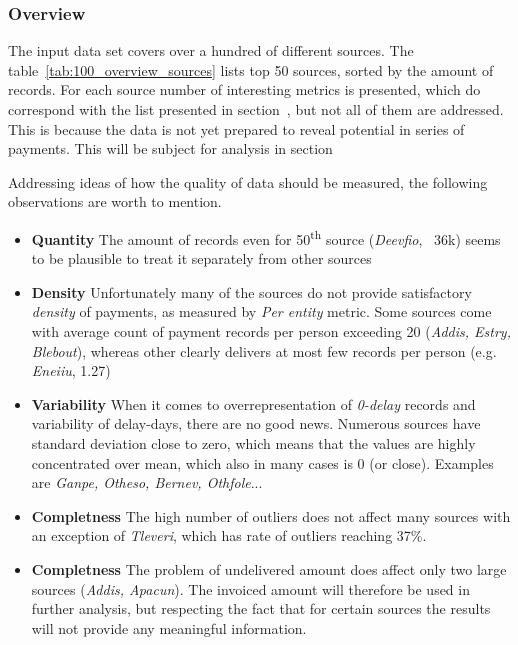 \documentclass{article}
\begin{document}
\subsubsection{Overview}

The input data set covers over a hundred of different sources.
The table\ \ref{tab:100_overview_sources} lists top 50 sources, sorted by the amount of records.
For each source number of interesting metrics is presented, which do correspond with the list presented in section\ , but not all of them are addressed.
This is because the data is not yet prepared to reveal potential in series of payments.
This will be subject for analysis in section\  \par



Addressing ideas of how the quality of data should be measured, the following observations are worth to mention.
\begin{itemize}
    \item \textbf{Quantity} The amount of records even for 50\textsuperscript{th} source (\textit{Deevfio}, ~36k) seems to be plausible to treat it separately from other sources
    \item \textbf{Density} Unfortunately many of the sources do not provide satisfactory \textit{density} of payments, as measured by \textit{Per entity} metric. Some sources come with average count of payment records per person exceeding 20 (\textit{Addis, Estry, Blebout}), whereas other clearly delivers at most few records per person (e.g. \textit{Eneiiu}, 1.27)
    \item \textbf{Variability} When it comes to overrepresentation of \textit{0-delay} records and variability of delay-days, there are no good news. Numerous sources have standard deviation close to zero, which means that the values are highly concentrated over mean, which also in many cases is 0 (or close). Examples are \textit{Ganpe, Otheso, Bernev, Othfole}...
    \item \textbf{Completness} The high number of outliers does not affect many sources with an exception of \textit{Tleveri}, which has rate of outliers reaching 37\%.
    \item \textbf{Completness} The problem of undelivered amount does affect only two large sources (\textit{Addis, Apacun}). The invoiced amount will therefore be used in further analysis, but respecting the fact that for certain sources the results will not provide any meaningful information.
\end{itemize}
\end{document}
